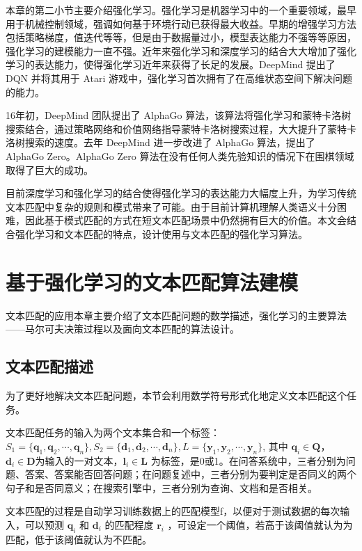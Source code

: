 本章的第二小节主要介绍强化学习。强化学习是机器学习中的一个重要领域，最早用于机械控制领域，强调如何基于环境行动已获得最大收益。早期的增强学习方法包括策略梯度，值迭代等等，但是由于数据量过小，模型表达能力不强等等原因，强化学习的建模能力一直不强。近年来强化学习和深度学习的结合大大增加了强化学习的表达能力，使得强化学习近年来获得了长足的发展。DeepMind 提出了 DQN 并将其用于 Atari 游戏中，强化学习首次拥有了在高维状态空间下解决问题的能力。

16年初，DeepMind 团队提出了 AlphaGo 算法，该算法将强化学习和蒙特卡洛树搜索结合，通过策略网络和价值网络指导蒙特卡洛树搜索过程，大大提升了蒙特卡洛树搜索的速度。去年 DeepMind 进一步改进了 AlphaGo 算法，提出了 AlphaGo Zero。AlphaGo Zero 算法在没有任何人类先验知识的情况下在围棋领域取得了巨大的成功。

目前深度学习和强化学习的结合使得强化学习的表达能力大幅度上升，为学习传统文本匹配中复杂的规则和模式带来了可能。由于目前计算机理解人类语义十分困难，因此基于模式匹配的方式在短文本匹配场景中仍然拥有巨大的价值。本文会结合强化学习和文本匹配的特点，设计使用与文本匹配的强化学习算法。

\chapter{基于强化学习的文本匹配算法建模}
文本匹配的应用本章主要介绍了文本匹配问题的数学描述，强化学习的主要算法——马尔可夫决策过程以及面向文本匹配的算法设计。
\section{文本匹配描述}
为了更好地解决文本匹配问题，本节会利用数学符号形式化地定义文本匹配这个任务。

文本匹配任务的输入为两个文本集合和一个标签：$S_1=\{\mathbf{q}_1, \mathbf{q}_2,\cdots,\mathbf{q}_n\}, S_2=\{\mathbf{d}_1, \mathbf{d}_2,\cdots,\mathbf{d}_n\}, L=\{\mathbf{y}_1, \mathbf{y}_2, \cdots, \mathbf{y}_n\}$,
其中 $\mathbf{q}_i \in \mathbf{Q}$，$\mathbf{d}_i \in \mathbf{D}$为输入的一对文本，$\mathbf{l}_i \in \mathbf{L}$ 为标签，是0或1。在问答系统中，三者分别为问题、答案、答案能否回答问题；在问题复述中，三者分别为要判定是否同义的两个句子和是否同意义；在搜索引擎中，三者分别为查询、文档和是否相关。

文本匹配的过程是自动学习训练数据上的匹配模型f，以便对于测试数据的每次输入，可以预测 $\mathbf{q}_i$ 和 $\mathbf{d}_i$ 的匹配程度 $\mathbf{r}_i$ ，可设定一个阈值，若高于该阈值就认为为匹配，低于该阈值就认为不匹配。

